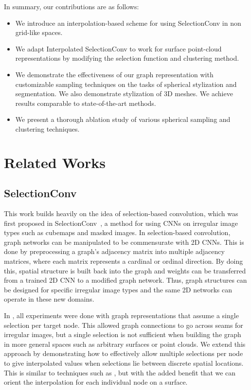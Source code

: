 \documentclass[10pt,twocolumn,letterpaper]{article}
\begin{document}
In summary, our contributions are as follows:

\begin{itemize}
    \item We introduce an interpolation-based scheme for using SelectionConv in non grid-like spaces.
    \item We adapt Interpolated SelectionConv to work for surface point-cloud representations by modifying the selection function and clustering method.
    \item We demonstrate the effectiveness of our graph representation with customizable sampling techniques on the tasks of spherical stylization and segmentation. We also demonstrate stylization of 3D meshes. We achieve results comparable to state-of-the-art methods.
    \item We present a thorough ablation study of various spherical sampling and clustering techniques. \end{itemize}

\section{Related Works}

\subsection{SelectionConv} \label{sec:SelectionRelated}

This work builds heavily on the idea of selection-based convolution, which was first proposed in SelectionConv~\cite{SelectionConv}, 
a method for using CNNs on irregular image types such as cubemaps and masked images. 
In selection-based convolution, graph networks can be manipulated to be commensurate with 2D CNNs. This is done by preprocessing a graph's adjacency matrix into multiple adjacency matrices, where each matrix represents a cardinal or ordinal direction. By doing this, spatial structure is built back into the graph and weights can be transferred from a trained 2D CNN to a modified graph network.
Thus, graph structures can be designed for specific irregular image types and the same 2D networks can operate in these new domains.

In \cite{SelectionConv}, all experiments were done with graph representations that assume a single selection per target node. 
This allowed graph connections to go across seams for irregular images, but a single selection is not sufficient when building the graph in more general spaces such as arbitrary surfaces or point clouds.
We extend this approach by demonstrating how to effectively allow multiple selections per node to give interpolated values when selections lie between discrete spatial locations.
This is similar to techniques such as \cite{InterpConv}, but with the added benefit that we can orient the interpolation for each individual node on a surface. 
\end{document}
